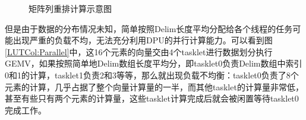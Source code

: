 \begin{figure}[htbp!]
	\centering
	\caption{矩阵列重排计算示意图}
    \label{LUTCol}
\end{figure}

但是由于数据的分布情况未知，简单按照Delim长度平均分配给各个线程的任务可能出现严重的负载不均，无法充分利用DPU的并行计算能力。可以看到图\ref{LUTCol:Parallel}中，这16个元素的向量交由4个tasklet进行数据划分执行GEMV，如果按照简单地Delim数组长度平均分，即tasklet0负责Delim数组中索引0和1的计算，tasklet1负责2和3等等，那么就出现负载不均衡：tasklet0负责了8个元素的计算，几乎占据了整个向量计算量的一半，而其他tasklet的计算量非常低，甚至有些只有两个元素的计算量，这些tasklet计算完成后就会被闲置等待tasklet0完成工作。

